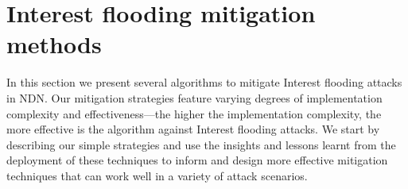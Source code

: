 \section{Interest flooding mitigation methods}
\label{sec:design}



In this section we present several algorithms to mitigate Interest flooding attacks in NDN.  Our mitigation strategies feature varying degrees of implementation complexity and effectiveness---the higher the implementation complexity, the more effective is the algorithm against Interest flooding attacks. We start by describing our simple strategies and use the insights and lessons learnt from the deployment of these techniques to inform and design more effective mitigation techniques that can work well in a variety of attack scenarios.






